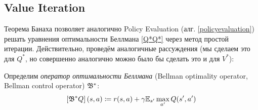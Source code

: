 



\subsection{Value Iteration}

Теорема Банаха позволяет аналогично Policy Evaluation (алг. \ref{policyevaluation}) решать уравнения оптимальности Беллмана \eqref{Q*Q*} через метод простой итерации. Действительно, проведём аналогичные рассуждения (мы сделаем это для $Q^*$, но совершенно аналогично можно было бы сделать это и для $V^*$):

\begin{definition}
Определим \emph{оператор оптимальности Беллмана} (Bellman optimality operator, Bellman control operator) $\mathfrak{B}^*$:
$$\left[\mathfrak{B}^* Q\right] (s, a) \coloneqq r(s, a) + \gamma \mathbb{E}_{s'} \max_{a'}Q(s', a')$$
\end{definition}

